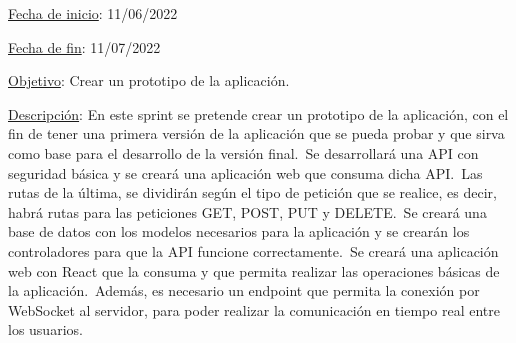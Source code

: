 
\underline{Fecha de inicio}: 11/06/2022

\underline{Fecha de fin}: 11/07/2022

\underline{Objetivo}:
Crear un prototipo de la aplicación.

\underline{Descripción}:
En este sprint se pretende crear un prototipo de la aplicación, con el fin de tener una primera versión de la
aplicación que se pueda probar y que sirva como base para el desarrollo de la versión final.\ Se desarrollará
una API con seguridad básica y se creará una aplicación web que consuma dicha API\@.\ Las rutas de la última\@,
se dividirán según el tipo de petición que se realice, es decir, habrá rutas para las peticiones GET, POST, PUT y
DELETE\@.\ Se creará una base de datos con los modelos necesarios para la aplicación y se crearán los controladores
para que la API funcione correctamente.\ Se creará una aplicación web con React que la consuma y que
permita realizar las operaciones básicas de la aplicación.\ Además, es necesario un endpoint que permita
la conexión por WebSocket al servidor, para poder realizar la comunicación en tiempo real entre los usuarios.
